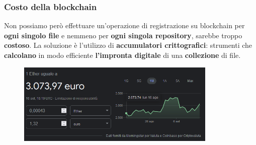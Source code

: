 \documentclass{beamer}
\begin{document}

\begin{frame}
	\frametitle{Costo della blockchain}
	Non possiamo però effettuare un'operazione di registrazione su blockchain per \textbf{ogni singolo file}
	e nemmeno per \textbf{ogni singola repository}, sarebbe troppo \textbf{costoso}.
	La soluzione è l'utilizzo di \textbf{accumulatori crittografici}:
	strumenti che \textbf{calcolano} in modo efficiente \textbf{l'impronta digitale}
	di una \textbf{collezione} di file.
	\medskip
	\begin{figure}
		\includegraphics[width=0.85\textwidth]{figures/costo.png}
	\end{figure}
\end{frame}
\end{document}
